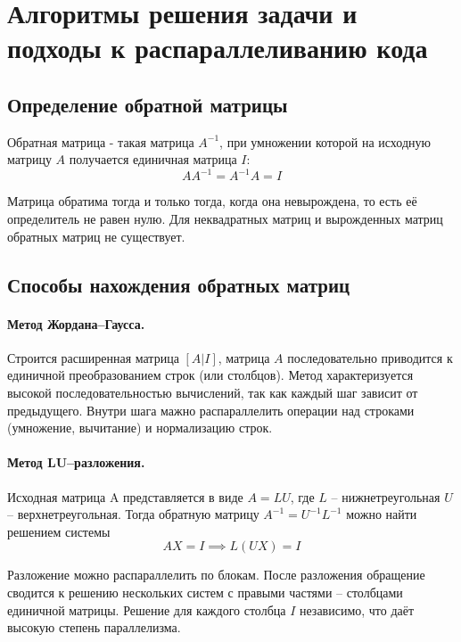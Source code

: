 \documentclass[12pt]{article}
\begin{document}
	
	
	
	\newpage
	\tableofcontents
	
	
	\newpage
	\section{Алгоритмы решения задачи и подходы к распараллеливанию кода}
	\subsection{Определение обратной матрицы}
	
	\par Обратная матрица - такая матрица \(A^{-1}\), при умножении которой на исходную матрицу \(A\) получается единичная матрица \(I\): \[AA^{-1}=A^{-1}A=I\]
	\par Матрица обратима тогда и только тогда, когда она невырождена, то есть её определитель не равен нулю. Для неквадратных матриц и вырожденных матриц обратных матриц не существует.
	
	\subsection{Способы нахождения обратных матриц}
	\paragraph{Метод Жордана--Гаусса.}
	Строится расширенная матрица \([A|I]\), матрица \(A\) последовательно приводится к единичной преобразованием строк (или столбцов). Метод характеризуется высокой последовательностью вычислений, так как каждый шаг зависит от предыдущего. Внутри шага мажно распараллелить операции над строками (умножение, вычитание) и нормализацию строк.
	
	\paragraph{Метод LU--разложения.} Исходная матрица A представляется в виде \(A=LU\), где \(L\) -- нижнетреугольная \(U\) -- верхнетреугольная. Тогда обратную матрицу \(A^{-1}=U^{-1}L^{-1}\) можно найти решением системы \[AX=I \implies L(UX)=I\]
	\par Разложение можно распараллелить по блокам. После разложения обращение сводится к решению нескольких систем с правыми частями -- столбцами единичной матрицы. Решение для каждого столбца \(I\) независимо, что даёт высокую степень параллелизма.
	
	
\end{document}
